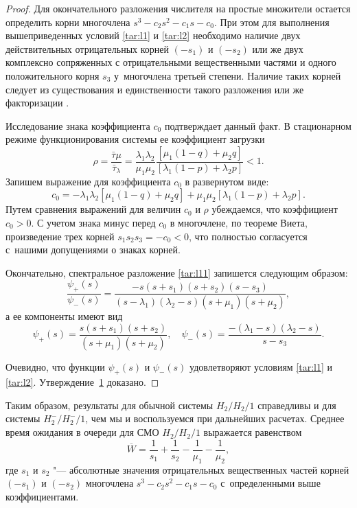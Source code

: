 \begin{proof}
Для окончательного разложения числителя на простые множители остается определить корни многочлена $s^3-c_2s^2-c_1s-c_0$.  При этом для выполнения вышеприведенных условий \eqref{tar:l1} и \eqref{tar:l2} необходимо наличие двух действительных отрицательных корней $(-s_1)$ и $(-s_2)$ или же двух комплексно сопряженных с отрицательными вещественными частями и одного положительного корня $s_3$ у~многочлена третьей степени. 
Наличие таких корней следует из существования и единственности такого разложения \cite {tar:klein} или же факторизации  \cite {tar:boch}.

Исследование знака коэффициента $c_0$  подтверждает данный факт. 
В стационарном режиме функционирования системы ее коэффициент загрузки 
$$
\rho=\frac{{{{\bar\tau}\mu}}}{{{{\bar\tau}_\lambda}}}=\frac{{{\lambda_1}{\lambda_2}}}{{{\mu_1}{\mu_2}}}\frac{{\left[{{\mu_1}\left({1-q}\right)+{\mu_2}q}\right]}}{{\left[{{\lambda_1}\left({1-p}\right)+{\lambda_2}p}\right]}}<1.
$$ 
Запишем выражение для коэффициента $c_0$ в развернутом виде: 
$${c_0}=-{\lambda_1}{\lambda_2}\left[{{\mu_1}\left({1-q}\right)+{\mu_2}q}\right]+{\mu_1}{\mu_2}\left[{{\lambda_1}\left({1-p}\right)+{\lambda_2}p}\right].$$ 
Путем сравнения выражений для величин  $c_0$ и $\rho$ убеждаемся, что коэффициент ${c_0}>0$.
С учетом знака минус перед $c_0$ в многочлене, по теореме Виета, произведение трех корней ${s_1}{s_2}{s_3}=-{c_0}<0$, что полностью согласуется с~нашими допущениями о знаках корней.

Окончательно, спектральное разложение \eqref{tar:l11} запишется следующим образом:
$$
\frac{{{\psi_+}\left(s\right)}}{{{\psi_-}\left(s\right)}}=\frac{{-s(s+{s_1})(s +{s_2})(s-{s_3})}}{{(s-{\lambda_1})({\lambda_2}-s)(s +{\mu_1})(s+{\mu_2})}}, 
$$
а ее компоненты имеют вид  
$$
{\psi_+}\left(s\right)=\frac{{s\left({s+{s_1}}\right)
\left({s+{s_2}}\right)}}{{\left({s+{\mu_1}}\right)\left({s+{\mu_2}}\right)}},
\quad 
{\psi_-}\left(s\right)=\frac{{-\left({{\lambda_1}-s}\right)\left({{\lambda_2}-s}\right)}}{{s-{s_3}}}.
$$ 

Очевидно, что функции $\psi_+(s)$  и  $\psi_-(s)$ удовлетворяют условиям  \eqref{tar:l1} и \eqref{tar:l2}.
Утверждение~\hyperlink{taras:utv1}{1}  доказано. \end{proof}

\smallskip

Таким образом, результаты для обычной системы $H_2/H_2/1$ справедливы и для системы $H_2^-/H_2^-/1$, чем мы и воспользуемся при дальнейших расчетах. 
Среднее время ожидания в очереди для СМО $H_2/H_2/1$ выражается равенством \cite{tar:tarasov_2,tar:tarasov_3}
\begin{equation}
\label{tar:l12}
\overline{W}=\frac{1}{s_1}+\frac{1}{s_2}-\frac{1}{\mu_1}-\frac{1}{\mu_2},
\end{equation}
где $s_1$ и $s_2$  "--- абсолютные значения отрицательных вещественных частей корней $(-s_1)$ и $(-s_2)$ многочлена $s^3-c_2s^2-c_1s-c_0$ с~определенными выше коэффициентами. 

